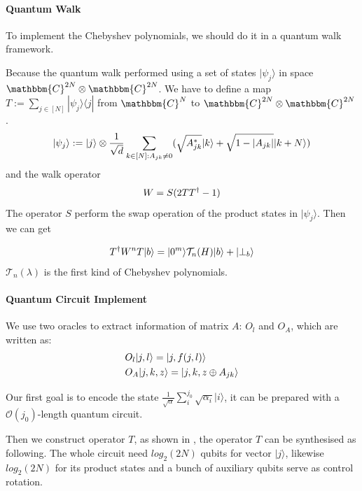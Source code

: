 \documentclass[%
 reprint,
 amsmath,amssymb,
pra,
]{revtex4-1}
\begin{document}
\paragraph{Quantum Walk}
To implement the Chebyshev polynomials, we should do it in a quantum walk 
framework. 

Because the quantum walk performed using a set of states $|\psi_j\rangle$
in space $\mathbbm{C}^{2N}\otimes
\mathbbm{C}^{2N}$.
We have to define a map $T:=\sum_{j\in [N]}|\psi_j\rangle\langle j|$ from
$\mathbbm{C}^{N}$ to $\mathbbm{C}^{2N}\otimes\mathbbm{C}^{2N}$.
\begin{equation}
|\psi_j\rangle:=|j\rangle\otimes \frac{1}{\sqrt{d}}
\sum_{k\in [N]:A_{jk}\neq 0}(\sqrt{A^*_{jk}}|k\rangle+\sqrt{1-|A_{jk}|}|k+N
\rangle)\notag
\end{equation}
and the walk operator
\begin{equation}
W=S(2TT^\dagger-1)\notag
\end{equation}
The operator $S$ perform the swap operation of the product states in 
$|\psi_j\rangle$. Then we can get 

\begin{equation}
T^{\dagger}W^nT|b\rangle=|0^m\rangle\mathcal{T}_n(H)|b\rangle+|\bot_b\rangle\notag
\end{equation}
$\mathcal{T}_n(\lambda)$ is the first kind of Chebyshev polynomials.

\paragraph{Quantum Circuit Implement}
We use two oracles to extract information of matrix $A$: $O_l$ and $O_A$, which are written as:
\begin{align}
&O_l|j,l\rangle=|j,f(j,l)\rangle\notag\\
&O_A|j,k,z\rangle=|j,k,z\oplus A_{jk}\rangle\notag
\end{align}


Our first goal is to encode the state $\frac{1}
{\sqrt{\alpha}}\sum_i^{j_0}\sqrt{\alpha_i}|i\rangle$, it can be prepared with a $\mathcal{O}(j_0)$-length quantum circuit.

Then we construct operator $T$, as shown in \cite{berry2015hamiltonian}, the operator $T$ can be synthesised as following.
The whole circuit need $log_2(2N)$ qubits for vector $|j\rangle$, likewise 
$log_2(2N)$ for its product states and a bunch of auxiliary qubits serve as 
control rotation.
\end{document}
